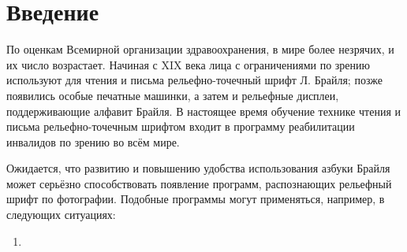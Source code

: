 \documentclass{main.tex}[subfiles]
\begin{document}
\section{Введение}
По оценкам Всемирной организации здравоохранения, в мире более %
незрячих, и их число возрастает. %
Начиная с XIX века лица с ограничениями по зрению используют для чтения и письма рельефно-точечный шрифт Л. Брайля; позже появились особые печатные машинки, а затем и рельефные дисплеи, поддерживающие алфавит Брайля.
В настоящее время обучение технике чтения и письма рельефно-точечным шрифтом входит в программу реабилитации инвалидов по зрению во всём мире.

Ожидается, что развитию и повышению удобства использования азбуки Брайля может серьёзно способствовать появление программ, распознающих рельефный шрифт по фотографии.
Подобные программы могут применяться, например, в следующих ситуациях:
\begin{enumerate}[noitemsep]
	\item %
\end{enumerate}

\cite{begun2019}
\cite{zuev2021}
\end{document}
